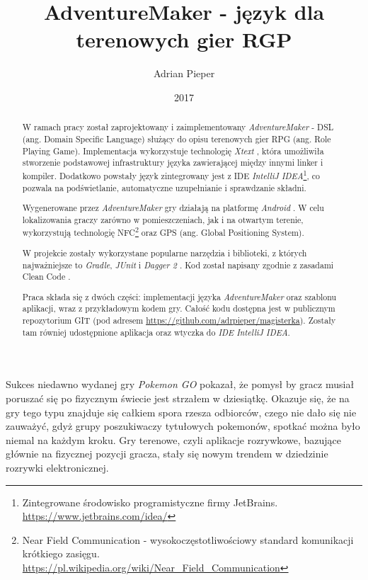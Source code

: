 \documentclass[openright]{xmgr}
\author   {Adrian Pieper}
\title    {AdventureMaker - język dla terenowych gier RGP}
\date     {2017}
\begin{document}
\begin{abstract}
  W ramach pracy został zaprojektowany i zaimplementowany \textit{AdventureMaker} - DSL (ang. Domain Specific Language) służący do opisu terenowych gier RPG (ang. Role Playing Game). Implementacja wykorzystuje technologię \textit{Xtext} \cite{Xtext:2017:Doc}, która umożliwiła stworzenie podstawowej infrastruktury języka zawierającej między innymi linker i kompiler. Dodatkowo powstały język zintegrowany jest z IDE \textit{IntelliJ IDEA}\footnote{Zintegrowane środowisko programistyczne firmy JetBrains. \url{https://www.jetbrains.com/idea/}}, co pozwala na podświetlanie, automatyczne uzupełnianie i sprawdzanie składni.
  
  Wygenerowane przez \textit{AdventureMaker} gry działają na platformę \textit{Android} \cite{AndroidSDK:2017:Doc}. W celu lokalizowania graczy zarówno w pomieszczeniach, jak i na otwartym terenie, wykorzystują technologię NFC\footnote{Near Field Communication - wysokoczęstotliwościowy standard komunikacji krótkiego zasięgu. \url{https://pl.wikipedia.org/wiki/Near_Field_Communication}} oraz GPS (ang. Global Positioning System).
  
  W projekcie zostały wykorzystane popularne narzędzia i biblioteki, z których najważniejsze to \textit{Gradle}\cite{Gradle:2017:Doc}, \textit{JUnit}\cite{JUnit:2017:Doc} i \textit{Dagger 2} \cite{Dagger2:2017:Doc}. Kod został napisany zgodnie z zasadami Clean Code \cite{CleanCode:2005}.
  
  Praca składa się z dwóch części: implementacji języka \textit{AdventureMaker} oraz szablonu aplikacji, wraz z przykładowym kodem gry. Całość kodu dostępna jest w publicznym repozytorium GIT (pod adresem \url{https://github.com/adrpieper/magisterka}). Zostały tam równiej udostępnione aplikacja oraz wtyczka do \textit{IDE IntelliJ IDEA}.
\end{abstract}


\maketitle

\introduction

Sukces niedawno wydanej gry \textit{Pokemon GO} pokazał, że pomysł by gracz musiał poruszać się po fizycznym świecie jest strzałem w dziesiątkę. Okazuje się, że na gry tego typu znajduje się całkiem spora rzesza odbiorców, czego nie dało się nie zauważyć, gdyż grupy poszukiwaczy tytułowych pokemonów, spotkać można było niemal na każdym kroku. Gry terenowe, czyli aplikacje rozrywkowe, bazujące głównie na fizycznej pozycji gracza, stały się nowym trendem w dziedzinie rozrywki elektronicznej.
\end{document}
